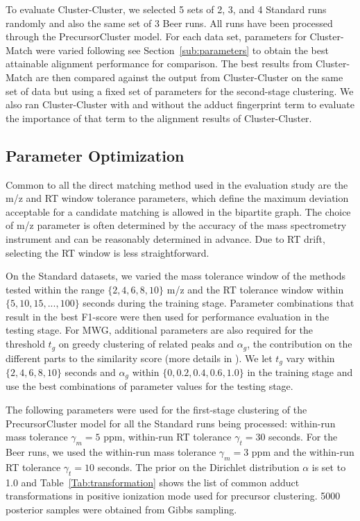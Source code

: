 To evaluate Cluster-Cluster, we selected 5 sets of 2, 3, and 4 Standard runs randomly and also the same set of 3 Beer runs. All runs have been processed through the PrecursorCluster model. For each data set, parameters for Cluster-Match were varied following see Section~\ref{sub:parameters} to obtain the best attainable alignment performance for comparison. The best results from Cluster-Match are then compared against the output from Cluster-Cluster on the same set of data but using a fixed set of parameters for the second-stage clustering. We also ran Cluster-Cluster with and without the adduct fingerprint term to evaluate the importance of that term to the alignment results of Cluster-Cluster.

\subsection{Parameter Optimization\label{sub:parameters}}

Common to all the direct matching method used in the evaluation study are the m/z and RT window tolerance parameters, which define the maximum deviation acceptable for a candidate matching is allowed in the bipartite graph. The choice of m/z parameter is often determined by the accuracy of the mass spectrometry instrument and can be reasonably determined in advance. Due to RT drift, selecting the RT window is less straightforward. 

On the Standard datasets, we varied the mass tolerance window of the methods tested within the range $\{2, 4, 6, 8, 10\}$ m/z and the RT tolerance window within $\{5, 10, 15, ..., 100\}$ seconds during the training stage. Parameter combinations that result in the best F1-score were then used for performance evaluation in the testing stage. For MWG, additional parameters are also required for the threshold $t_{g}$ on greedy clustering of related peaks and $\alpha_{g}$, the contribution on the different parts to the similarity score (more details in \cite{Wandy2015}). We let $t_g$ vary within $\{2, 4, 6, 8, 10\}$ seconds and $\alpha_g$ within $\{0, 0.2, 0.4, 0.6, 1.0\}$ in the training stage and use the best combinations of parameter values for the testing stage.

The following parameters were used for the first-stage clustering of the PrecursorCluster model for all the Standard runs being processed: within-run mass tolerance $\gamma_m=5$ ppm, within-run RT tolerance $\gamma_t=30$ seconds. For the Beer runs, we used the within-run mass tolerance $\gamma_m=3$ ppm and the within-run RT tolerance $\gamma_t=10$ seconds. The prior on the Dirichlet distribution $\alpha$ is set to 1.0 and Table~\ref{Tab:transformation} shows the list of common adduct transformations in positive ionization mode used for precursor clustering. 5000 posterior samples were obtained from Gibbs sampling.

